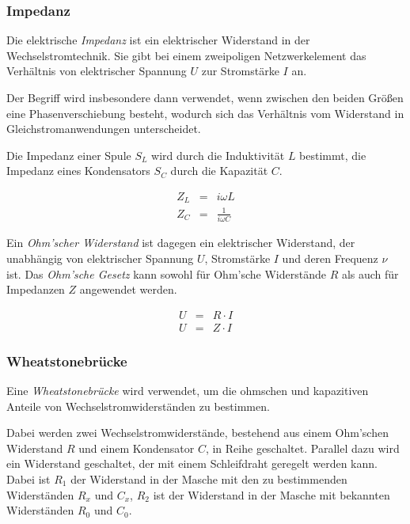 \documentclass[12pt,a4paper]{scrartcl}
\numberwithin{equation}{section} %
\begin{document}
\hypertarget{impedanz}{%
\subsubsection{Impedanz}\label{impedanz}}

Die elektrische \emph{Impedanz} ist ein elektrischer Widerstand in der
Wechselstromtechnik. Sie gibt bei einem zweipoligen Netzwerkelement das
Verhältnis von elektrischer Spannung $U$ zur Stromstärke $I$ an.

Der Begriff wird insbesondere dann verwendet, wenn zwischen den beiden
Größen eine Phasenverschiebung besteht, wodurch sich das Verhältnis vom
Widerstand in Gleichstromanwendungen unterscheidet.

Die Impedanz einer Spule $S_L$ wird durch die Induktivität $L$
bestimmt, die Impedanz eines Kondensators $S_C$ durch die Kapazität
$C$.

\begin{eqnarray}
    Z_L &=& i\omega L \\
    Z_C &=& \frac{1}{i\omega C}
\end{eqnarray}

Ein \emph{Ohm'scher Widerstand} ist dagegen ein elektrischer Widerstand,
der unabhängig von elektrischer Spannung $U$, Stromstärke $I$ und
deren Frequenz $\nu$ ist. Das \emph{Ohm'sche Gesetz} kann sowohl für
Ohm'sche Widerstände $R$ als auch für Impedanzen $Z$ angewendet
werden.

\begin{eqnarray}
    U &=& R\cdot I \\
    U &=& Z\cdot I
\end{eqnarray}

\hypertarget{wheatstonebruxfccke}{%
\subsubsection{Wheatstonebrücke}\label{wheatstonebruxfccke}}

Eine \emph{Wheatstonebrücke} wird verwendet, um die ohmschen und
kapazitiven Anteile von Wechselstromwiderständen zu bestimmen.

Dabei werden zwei Wechselstromwiderstände, bestehend aus einem Ohm'schen
Widerstand $R$ und einem Kondensator $C$, in Reihe geschaltet.
Parallel dazu wird ein Widerstand geschaltet, der mit einem Schleifdraht
geregelt werden kann. Dabei ist $R_1$ der Widerstand in der Masche mit
den zu bestimmenden Widerständen $R_x$ und $C_x$, $R_2$ ist der
Widerstand in der Masche mit bekannten Widerständen $R_0$ und $C_0$.
\end{document}

